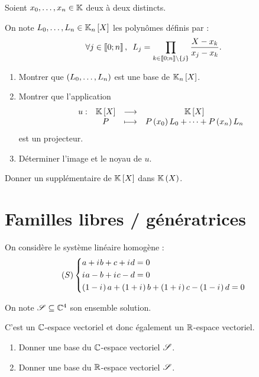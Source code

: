 \begin{exo}
Soient \(x_0,\dots,x_n\in\mathbb{K}\) deux à deux distincts.

On note \(L_0,\dots,L_n\in\polydeg{n}\) les polynômes définis par : \[\quantifs{\forall j\in\interventierii{0}{n}}L_j=\prod_{k\in\interventierii{0}{n}\excluant\accol{j}}\dfrac{X-x_k}{x_j-x_k}.\]

\begin{enumerate}
\item Montrer que \(\left(L_0,\dots,L_n\right)\) est une base de \(\polydeg{n}\). \\

\item Montrer que l'application \[\fonction{u}{\poly}{\poly}{P}{P\paren{x_0}L_0+\dots+P\paren{x_n}L_n}\] est un projecteur. \\

\item Déterminer l'image et le noyau de \(u\).
\end{enumerate}
\end{exo}

\begin{corr}
\end{corr}

\begin{exo}
Donner un supplémentaire de \(\poly\) dans \(\fracrat\).
\end{exo}

\begin{corr}
\end{corr}

\section{Familles libres / génératrices}

\begin{exo}
On considère le système linéaire homogène : \[\left(S\right)\begin{dcases}
a+i\mkern1mu b+c+i\mkern1mu d=0 \\
i\mkern1mu a-b+i\mkern1mu c-d=0 \\
\left(1-i\mkern1mu\right)a+\left(1+i\mkern1mu\right)b+\left(1+i\mkern1mu\right)c-\left(1-i\mkern1mu\right)d=0
\end{dcases}\]

On note \(\mathscr{S}\subseteq\mathbb{C}^4\) son ensemble solution.

C'est un \(\mathbb{C}\)-espace vectoriel et donc également un \(\mathbb{R}\)-espace vectoriel.

\begin{enumerate}
\item Donner une base du \(\mathbb{C}\)-espace vectoriel \(\mathscr{S}\). \\

\item Donner une base du \(\mathbb{R}\)-espace vectoriel \(\mathscr{S}\).
\end{enumerate}
\end{exo}

